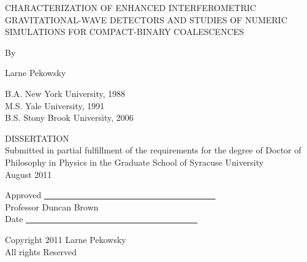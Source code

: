 \documentclass[12pt,notitlepage]{report}
\begin{document}
\newpage

\begin{center}
\vspace*{0.75in}

CHARACTERIZATION OF ENHANCED INTERFEROMETRIC GRAVITATIONAL-WAVE
DETECTORS AND STUDIES OF NUMERIC SIMULATIONS FOR COMPACT-BINARY
COALESCENCES

\vspace*{0.75in}

By
\vspace*{0.25in}

Larne Pekowsky

B.A. New York University, 1988 \\
M.S. Yale University, 1991 \\
B.S. Stony Brook University, 2006 \\ 

\vspace{0.75in}

DISSERTATION \\

\vspace{0.5 in}
Submitted in partial fulfillment of the requirements for the degree of
Doctor of Philosophy in Physics in the Graduate School of Syracuse
University \\
\vspace*{0.25in}
August 2011
\end{center}

\vspace*{1.00in}

\begin{flushright}

Approved \underline{~~~~~~~~~~~~~~~~~~~~~~~~~~~~~~~~~~~~~~~~} \\
Professor Duncan Brown \\
Date \underline{~~~~~~~~~~~~~~~~~~~~~~~~~~~~~~~~~~~~~~~~} \\

\end{flushright}

\newpage
\begin{center}
\vspace*{1.00in}
Copyright 2011 Larne Pekowsky \\
All rights Reserved
\end{center}
\newpage


\iffalse
\author{\bf Larne Pekowsky}
\end{document}
